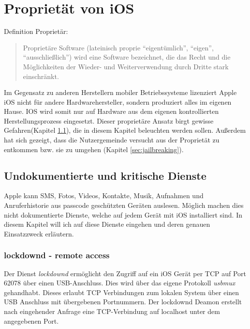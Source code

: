 \section{Proprietät von iOS}
	Definition Proprietär:
	\begin{quote}
		Proprietäre Software (lateinisch proprie "`eigentümlich"', "`eigen"',
		"`ausschließlich"') wird eine Software bezeichnet, die das Recht und die
		Möglichkeiten der Wieder- und Weiterverwendung durch Dritte stark einschränkt.
		\cite{WikiProprietary2015}
	\end{quote}
	Im Gegensatz zu anderen Herstellern mobiler Betriebssysteme lizenziert Apple
	iOS nicht für andere Hardwarehersteller, sondern produziert alles im
	eigenen Hause. IOS wird somit nur auf Hardware aus dem eigenen kontrollierten
	Herstellungsprozess eingesetzt. Dieser proprietäre Ansatz birgt gewisse
	Gefahren(Kapitel
	\ref{sec:undocumented-services}), die in diesem Kapitel beleuchten werden
	sollen. Außerdem hat sich gezeigt, dass die Nutzergemeinde versucht aus der
	Proprietät zu entkommen bzw. sie zu umgehen (Kapitel \ref{sec:jailbreaking}).
	
	\subsection{Undokumentierte und kritische Dienste}\label{sec:undocumented-services}
		Apple kann SMS, Fotos, Videos, Kontakte, Musik, Aufnahmen und Anruferhistorie
		aus passcode geschützten Geräten auslesen. Möglich machen dies nicht
		dokumentierte Dienste, welche auf jedem Gerät mit iOS installiert sind. In
		diesem Kapitel will ich auf diese Dienste eingehen und deren genauen
		Einsatzzweck erläutern.
		\subsubsection{lockdownd - remote access}
			Der Dienst \textsl{lockdownd} ermöglicht den Zugriff auf ein iOS Gerät
			per TCP auf Port 62078 über einen USB-Anschluss.
			Dies wird über das eigene Protokoll \textsl{usbmux} gehandhabt. Dieses
			erlaubt TCP Verbindungen zum lokalen System über einen USB Anschluss mit
			übergebenen	Portnummern. Der lockdownd Deamon erstellt nach eingehender
			Anfrage eine TCP-Verbindung auf localhost unter dem angegebenen Port.

